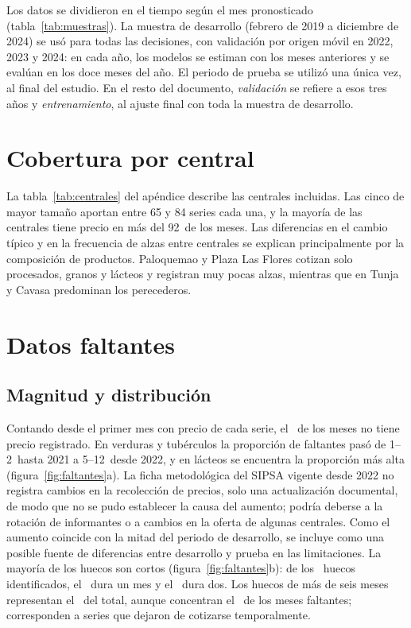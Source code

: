 

Los datos se dividieron en el tiempo según el mes pronosticado (tabla~\ref{tab:muestras}). La muestra de desarrollo (febrero de 2019 a diciembre de 2024) se usó para todas las decisiones, con validación por origen móvil en 2022, 2023 y 2024: en cada año, los modelos se estiman con los meses anteriores y se evalúan en los doce meses del año. El periodo de prueba se utilizó una única vez, al final del estudio. En el resto del documento, \emph{validación} se refiere a esos tres años y \emph{entrenamiento}, al ajuste final con toda la muestra de desarrollo.



\section{Cobertura por central}
\label{sec:cobertura}

La tabla~\ref{tab:centrales} del apéndice describe las centrales incluidas. Las cinco de mayor tamaño aportan entre 65 y 84 series cada una, y la mayoría de las centrales tiene precio en más del 92\pct\ de los meses. Las diferencias en el cambio típico y en la frecuencia de alzas entre centrales se explican principalmente por la composición de productos. Paloquemao y Plaza Las Flores cotizan solo procesados, granos y lácteos y registran muy pocas alzas, mientras que en Tunja y Cavasa predominan los perecederos.

\section{Datos faltantes}
\label{sec:faltantes}

\subsection*{Magnitud y distribución}

Contando desde el primer mes con precio de cada serie, el \cfaltserie\pct\ de los meses no tiene precio registrado. En verduras y tubérculos la proporción de faltantes pasó de 1--2\pct\ hasta 2021 a 5--12\pct\ desde 2022, y en lácteos se encuentra la proporción más alta (figura~\ref{fig:faltantes}a). La ficha metodológica del SIPSA vigente desde 2022 \citep{danefme2022} no registra cambios en la recolección de precios, solo una actualización documental, de modo que no se pudo establecer la causa del aumento; podría deberse a la rotación de informantes o a cambios en la oferta de algunas centrales. Como el aumento coincide con la mitad del periodo de desarrollo, se incluye como una posible fuente de diferencias entre desarrollo y prueba en las limitaciones. La mayoría de los huecos son cortos (figura~\ref{fig:faltantes}b): de los \cnhuecos\ huecos identificados, el \chuecouno\pct\ dura un mes y el \chuecodos\pct\ dura dos. Los huecos de más de seis meses representan el \chuecolargo\pct\ del total, aunque concentran el \chuecomeslargo\pct\ de los meses faltantes; corresponden a series que dejaron de cotizarse temporalmente.

